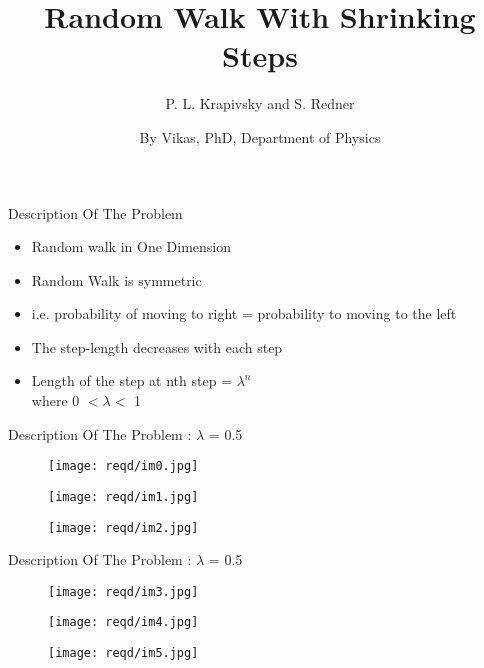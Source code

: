 \documentclass{beamer}
\subtitle{P. L. Krapivsky and S. Redner}
\title[Stat-Mech Presentation]{Random Walk With Shrinking Steps}
\author{By Vikas, PhD, Department of Physics}
\institute{\large \bfseries Indian Institute of Technology, Delhi}
\date{}
\begin{document}
\begin{frame}
	\titlepage
\end{frame}

\begin{frame}{Description Of The Problem}
	\begin{itemize}
	\setlength\itemsep{1em}
		\item{\large Random walk in One Dimension}
		\item{\large Random Walk is symmetric}
		\item{\large i.e. probability of moving to right = probability to moving to the left}
		\item{\large The step-length decreases with each step}
		\item{\large Length of the step at nth step = $\lambda^{n}$\\
		\vspace{0.5em}
		where 0 $<\lambda<$ 1}
	\end{itemize}
\end{frame}

\begin{frame}{Description Of The Problem : $\lambda$ = 0.5}
	\begin{figure}
		\centering
		\texttt{[image: reqd/im0.jpg]}
	\end{figure}
	\begin{figure}
		\centering
		\texttt{[image: reqd/im1.jpg]}
	\end{figure}
	\begin{figure}
		\centering
		\texttt{[image: reqd/im2.jpg]}
	\end{figure}
\end{frame}

\begin{frame}{Description Of The Problem : $\lambda$ = 0.5}
	\begin{figure}
		\centering
		\texttt{[image: reqd/im3.jpg]}
	\end{figure}
	\begin{figure}
		\centering
		\texttt{[image: reqd/im4.jpg]}
	\end{figure}
	\begin{figure}
		\centering
		\texttt{[image: reqd/im5.jpg]}
	\end{figure}	
\end{frame}
\end{document}
